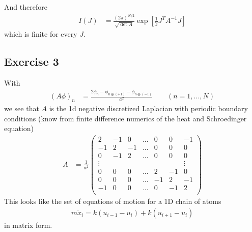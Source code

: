 \documentclass[10pt,a4paper]{article}
\theoremstyle{definition}
\begin{document}
And therefore
\begin{align}
I(J)&=\frac{(2\pi)^{N/2}}{\sqrt{\det A}}\exp\left[\frac{1}{2}J^TA^{-1}J\right]
\end{align}
which is finite for every $J$.

\newpage
\subsection{Exercise 3}
With
\begin{align}
(A\phi)_n&=\frac{2\phi_n-\phi_{n\oplus(+1)}-\phi_{n\oplus(-1)}}{a^2}\qquad(n=1,...,N)
\end{align}
we see that $A$ is the 1d negative discretized Laplacian with periodic boundary conditions (know from finite difference numerics of the heat and Schroedinger equation)
\begin{align}
A&=\frac{1}{a^2}\left(
\begin{matrix}
 2 & -1 &  0 &...& 0 & 0 & -1\\
-1 &  2 & -1 &...& 0 & 0 &  0\\
 0 & - 1&  2 &...& 0 & 0 &  0 \\
\vdots & & & & & &\vdots \\
 0 & 0 &  0 &...& 2 &-1 & 0\\
 0 & 0 &  0 &...&-1 & 2 &-1\\
-1 & 0 &  0 &...& 0 &-1 & 2\\
\end{matrix}
\right)
\end{align}
This looks like the set of equations of motion for a 1D chain of atoms
\begin{align}
m\ddot{x}_i=k(u_{i-1}-u_i)+k(u_{i+1}-u_i)
\end{align}
in matrix form.
\end{document}
